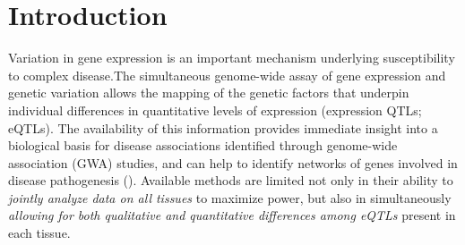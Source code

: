 \section*{Introduction}
Variation in gene expression is an important mechanism underlying susceptibility to complex disease.The simultaneous genome-wide assay of gene expression and genetic variation allows the mapping of the genetic factors that underpin individual differences in quantitative levels of expression (expression QTLs; eQTLs). 
The availability of this information provides immediate insight into a biological basis for disease associations identified through genome-wide association (GWA) studies, and can help to identify networks of genes 
involved in disease pathogenesis (\cite{nicolae_trait-associated_2010, veyrieras_high-resolution_2008}).
Available methods are limited not only in their ability to {\it jointly analyze data on all tissues} to maximize power, but also in simultaneously {\it allowing for both qualitative and quantitative differences among eQTLs} present in each tissue.

